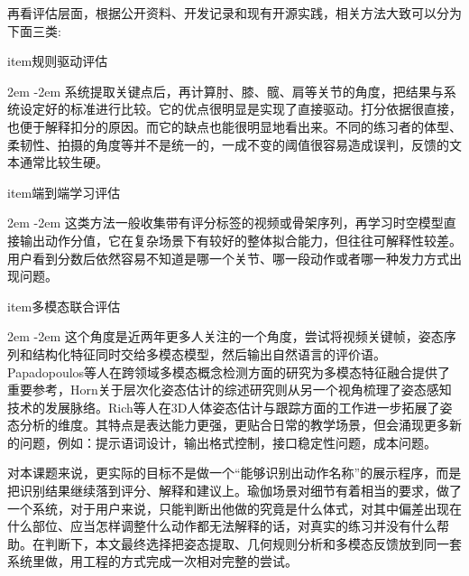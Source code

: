 \documentclass[UTF8,twoside]{ctexrep}
\makeatletter
\def@NAT@last@yr{\@citea}%
\def@NAT@last@yr{-\NAT@penalty}%
\newcommand{\listbodyaligntext}[1]{%
  \par\begingroup
    \parindent=0pt
    \parshape=2 2em \dimexpr\textwidth-2em\relax 0pt \textwidth
    \noindent\ignorespaces#1\unskip\par
  \endgroup
}
\newcommand{\researchitem}[2]{%
  \csname item\endcsname #1%
  \listbodyaligntext{#2}%
}
\makeatother
\begin{document}
再看评估层面，根据公开资料、开发记录和现有开源实践，相关方法大致可以分为下面三类:
\begin{researchlist}
  
\researchitem{规则驱动评估}{
    系统提取关键点后，再计算肘、膝、髋、肩等关节的角度，把结果与系统设定好的标准进行比较。它的优点很明显是实现了直接驱动。打分依据很直接，也便于解释扣分的原因。而它的缺点也能很明显地看出来。不同的练习者的体型、柔韧性、拍摄的角度等并不是统一的，一成不变的阈值很容易造成误判，反馈的文本通常比较生硬。
  }
  
\researchitem{端到端学习评估}{
    这类方法一般收集带有评分标签的视频或骨架序列，再学习时空模型直接输出动作分值，它在复杂场景下有较好的整体拟合能力，但往往可解释性较差。用户看到分数后依然容易不知道是哪一个关节、哪一段动作或者哪一种发力方式出现问题。
  }
  
\researchitem{多模态联合评估}{
    这个角度是近两年更多人关注的一个角度，尝试将视频关键帧，姿态序列和结构化特征同时交给多模态模型，然后输出自然语言的评价语。Papadopoulos等人\cite{ref_multimodal_concept}在跨领域多模态概念检测方面的研究为多模态特征融合提供了重要参考，Horn\cite{ref_pose_hierarchy}关于层次化姿态估计的综述研究则从另一个视角梳理了姿态感知技术的发展脉络。Rich等人\cite{ref_3d_pose_tracking}在3D人体姿态估计与跟踪方面的工作进一步拓展了姿态分析的维度。其特点是表达能力更强，更贴合日常的教学场景，但会涌现更多新的问题，例如：提示语词设计，输出格式控制，接口稳定性问题，成本问题。
  }
\end{researchlist}

对本课题来说，更实际的目标不是做一个“能够识别出动作名称”的展示程序，而是把识别结果继续落到评分、解释和建议上。瑜伽场景对细节有着相当的要求，做了一个系统，对于用户来说，只能判断出他做的究竟是什么体式，对其中偏差出现在什么部位、应当怎样调整什么动作都无法解释的话，对真实的练习并没有什么帮助。在判断下，本文最终选择把姿态提取、几何规则分析和多模态反馈放到同一套系统里做，用工程的方式完成一次相对完整的尝试。
\end{document}
